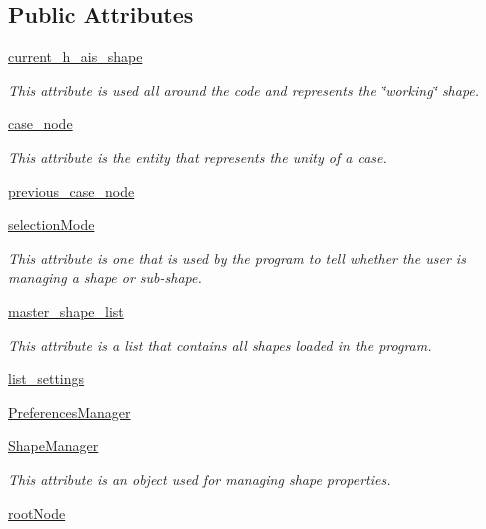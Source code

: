 \subsection*{Public Attributes}
\begin{DoxyCompactItemize}
\item 
\hyperlink{a00078_a84a62c3017515ec840e35dbbe8ccbf21}{current\+\_\+h\+\_\+ais\+\_\+shape}
\begin{DoxyCompactList}\small\item\em This attribute is used all around the code and represents the \char`\"{}working\char`\"{} shape. \end{DoxyCompactList}\item 
\hyperlink{a00078_a76f4a1191b8d68c0ed9d9f3e1e6756d8}{case\+\_\+node}
\begin{DoxyCompactList}\small\item\em This attribute is the entity that represents the unity of a case. \end{DoxyCompactList}\item 
\hyperlink{a00078_a43d75821c1883b1b972c8e0ef9922b4a}{previous\+\_\+case\+\_\+node}
\item 
\hyperlink{a00078_a84adec7b4b982bce58747d39e098236f}{selection\+Mode}
\begin{DoxyCompactList}\small\item\em This attribute is one that is used by the program to tell whether the user is managing a shape or sub-\/shape. \end{DoxyCompactList}\item 
\hyperlink{a00078_a819ef9e1cd2f233d92a5379532060bd0}{master\+\_\+shape\+\_\+list}
\begin{DoxyCompactList}\small\item\em This attribute is a list that contains all shapes loaded in the program. \end{DoxyCompactList}\item 
\hyperlink{a00078_a96038d8a4727208ba2e9cd359bcd4781}{list\+\_\+settings}
\item 
\hyperlink{a00078_abfb58254f95f980e2821bac01114cd40}{Preferences\+Manager}
\item 
\hyperlink{a00078_a1e75ee619926a396b584090b2707b1ca}{Shape\+Manager}
\begin{DoxyCompactList}\small\item\em This attribute is an object used for managing shape properties. \end{DoxyCompactList}\item 
\hyperlink{a00078_a3cbd742c4a4a706d44d5265e19b25aaa}{root\+Node}

\end{DoxyCompactItemize}
